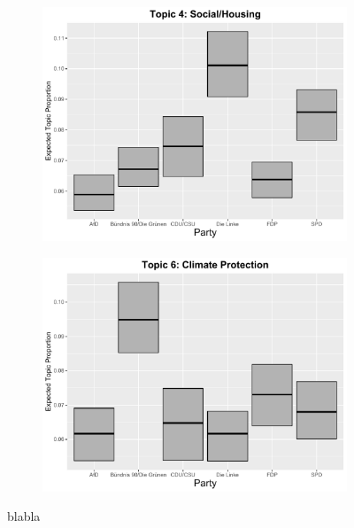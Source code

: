 \begin{figure}[h!]
  \centering
  \begin{subfigure}[b]{0.4\linewidth}
    \includegraphics[width=\linewidth]{../plots/appendix/4_6/beta_t4_cat_ctm.pdf}
  \end{subfigure}
  \begin{subfigure}[b]{0.4\linewidth}
    \includegraphics[width=\linewidth]{../plots/appendix/4_6/beta_t6_cat_ctm.pdf}
  \end{subfigure}
  \caption{blabla}
  \label{fig:beta_t46_cat_ctm}
\end{figure}

